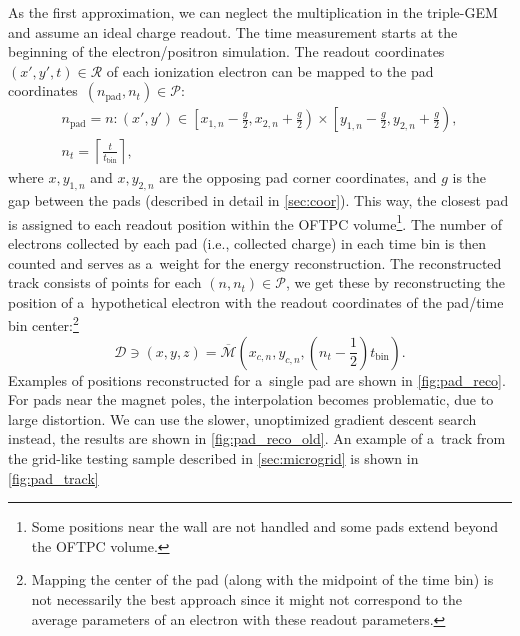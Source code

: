 		As the first approximation, we can neglect the multiplication in the triple\nobreakdash-\ac{GEM} and assume an ideal charge readout. The time measurement starts at the beginning of the electron/positron simulation. The readout coordinates ${(x',y',t)\in\mathcal{R}}$ of each ionization electron can be mapped to the pad coordinates~$(n_\text{pad},n_t) \in \mathcal{P}$:
			\begin{gather}
				n_\text{pad} = n\colon (x',y') \in \left[x_{1,n}-\frac{g}{2},x_{2,n}+\frac{g}{2}\right)\times\left[y_{1,n}-\frac{g}{2},y_{2,n}+\frac{g}{2}\right),\\
				n_t = \left\lceil \frac{t}{t_\text{bin}}\right\rceil,
			\end{gather}
		where $x,y_{1,n}$ and $x,y_{2,n}$ are the opposing pad corner coordinates, and $g$ is the gap between the pads (described in detail in \cref{sec:coor}). This way, the closest pad is assigned to each readout position within the \ac{OFTPC} volume\footnote{Some positions near the wall are not handled and some pads extend beyond the \ac{OFTPC} volume.}. The number of electrons collected by each pad (i.e., collected charge) in each time bin is then counted and serves as a~weight for the energy reconstruction. The reconstructed track consists of points for each $(n,n_t)\in\mathcal{P}$, we get these by reconstructing the position of a~hypothetical electron with the readout coordinates of the pad/time bin center:\footnote{Mapping the center of the pad (along with the midpoint of the time bin) is not necessarily the best approach since it might not correspond to the average parameters of an electron with these readout parameters.}
			\begin{equation}
				\mathcal{D} \ni (x,y,z) = \overline{\mathcal{M}}\left(x_{c,n},y_{c,n},\left(n_t-\frac{1}{2}\right)t_\text{bin}\right).
			\end{equation}
		Examples of positions reconstructed for a~single pad are shown in \cref{fig:pad_reco}. For pads near the magnet poles, the interpolation becomes problematic, due to large distortion. We can use the slower, unoptimized gradient descent search instead, the results are shown in \cref{fig:pad_reco_old}. An example of a~track from the grid-like testing sample described in \cref{sec:microgrid} is shown in \cref{fig:pad_track}
		
